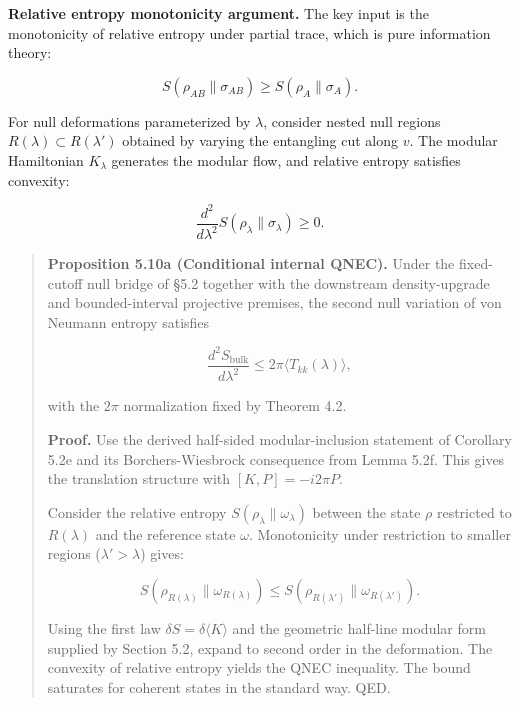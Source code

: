 \textbf{Relative entropy monotonicity argument.} The key input is the monotonicity of relative entropy under partial trace, which is pure information theory:

\[
S(\rho_{AB} \| \sigma_{AB}) \ge S(\rho_A \| \sigma_A).
\]

For null deformations parameterized by \(\lambda\), consider nested null regions \(R(\lambda) \subset R(\lambda')\) obtained by varying the entangling cut along \(v\). The modular Hamiltonian \(K_\lambda\) generates the modular flow, and relative entropy satisfies convexity:

\[
\frac{d^2}{d\lambda^2} S(\rho_\lambda \| \sigma_\lambda) \ge 0.
\]

\begin{quote}
\textbf{Proposition 5.10a (Conditional internal QNEC).} Under the fixed-cutoff null bridge of \S{}5.2 together with the downstream density-upgrade and bounded-interval projective premises, the second null variation of von Neumann entropy satisfies

\[
\frac{d^2 S_{\mathrm{bulk}}}{d\lambda^2} \le 2\pi \langle T_{kk}(\lambda) \rangle,
\]

with the \(2\pi\) normalization fixed by Theorem 4.2.

\textbf{Proof.} Use the derived half-sided modular-inclusion statement of Corollary 5.2e and its Borchers-Wiesbrock consequence from Lemma 5.2f. This gives the translation structure with \([K, P] = - i 2\pi P\).

Consider the relative entropy \(S(\rho_\lambda \| \omega_\lambda)\) between the state \(\rho\) restricted to \(R(\lambda)\) and the reference state \(\omega\). Monotonicity under restriction to smaller regions (\(\lambda' > \lambda\)) gives:

\[
S(\rho_{R(\lambda)} \| \omega_{R(\lambda)}) \le S(\rho_{R(\lambda')} \| \omega_{R(\lambda')}).
\]

Using the first law \(\delta S = \delta \langle K \rangle\) and the geometric half-line modular form supplied by Section 5.2, expand to second order in the deformation. The convexity of relative entropy yields the QNEC inequality. The bound saturates for coherent states in the standard way. QED.
\end{quote}

